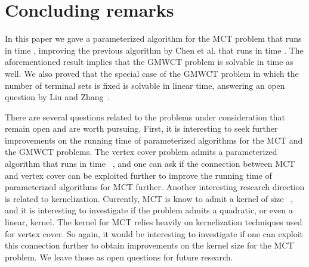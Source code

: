 \documentclass[11pt]{article}
\begin{document}
\section{Concluding remarks}
\label{sec:conclusion}
In this paper we gave a parameterized algorithm for the {\sc MCT} problem that runs in time , improving the previous algorithm by Chen et al. that runs in time . The aforementioned result implies that the {\sc GMWCT} problem is solvable in time  as well. We also proved that the special case of the {\sc GMWCT} problem in which the number of terminal sets is fixed is solvable in linear time, answering an open question by Liu and Zhang~\cite{LZ12}.

There are several questions related to the problems under consideration that remain open and are worth pursuing. First, it is interesting to seek further improvements on the running time of parameterized algorithms for the {\sc MCT} and the {\sc GMWCT} problems. The {\sc vertex cover} problem admits a parameterized algorithm that runs in time ~\cite{ckj}, and one can ask if the connection between {\sc MCT} and {\sc vertex cover} can be exploited further to improve the running time of parameterized algorithms for {\sc MCT} further. Another interesting research direction is related to kernelization. Currently, {\sc MCT} is know to admit a kernel of size ~\cite{multicut}, and it is interesting to investigate if the problem admits a quadratic, or even a linear, kernel. The  kernel for {\sc MCT} relies heavily on kernelization techniques used for {\sc vertex cover}. So again, it would be interesting to investigate if one can exploit this connection further to obtain improvements on the kernel size for the {\sc MCT} problem. We leave those as open questions for future research.




\end{document}
